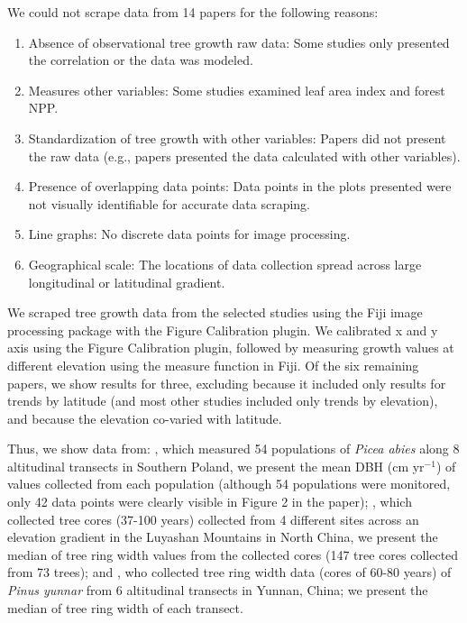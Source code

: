 \documentclass[11pt]{article}
\begin{document}
We could not scrape data from 14 papers for the following reasons: 
\begin{enumerate}
\item Absence of observational tree growth raw data: Some studies only presented the correlation or the data was modeled. 
\item  Measures other variables: Some studies examined leaf area index and forest NPP. 
\item  Standardization of tree growth with other variables: Papers did not present the raw data (e.g., papers presented the data calculated with other variables).
\item  Presence of overlapping data points: Data points in the plots presented were not visually identifiable for accurate data scraping.
\item Line graphs: No discrete data points for image processing. 
\item Geographical scale: The locations of data collection spread across large longitudinal or latitudinal gradient. 
\end{enumerate}

We scraped tree growth data from the selected studies using the Fiji image processing package with the Figure Calibration plugin. We calibrated x and y axis using the Figure Calibration plugin, followed by measuring growth values at different elevation using the measure function in Fiji. Of the six remaining papers, we show results for three, excluding \citet{huang2010radial} because it included only results for trends by latitude (and most other studies included only trends by elevation), and \citet{cavin2017highest,zhu2018spatial} because the elevation co-varied with latitude. %

Thus, we show data from: \citet{oleksyn1998growth}, which measured 54 populations of  \emph{Picea abies} along 8 altitudinal transects in Southern Poland, we present the mean DBH (cm yr$^{-1}$) of values collected from each population (although 54 populations were monitored, only 42 data points were clearly visible in Figure 2 in the paper); \citet{wang2017climatic}, which collected  tree cores (37-100 years) collected from 4 different sites across an elevation gradient in the Luyashan Mountains in North China, we present the median of tree ring width values from the collected cores (147 tree cores collected from 73 trees); and \citet{zhou2022altitudinal}, who collected tree ring width data (cores of 60-80 years) of \emph{Pinus yunnar} from 6 altitudinal transects in Yunnan, China; we present the median of tree ring width of each transect.
\end{document}
